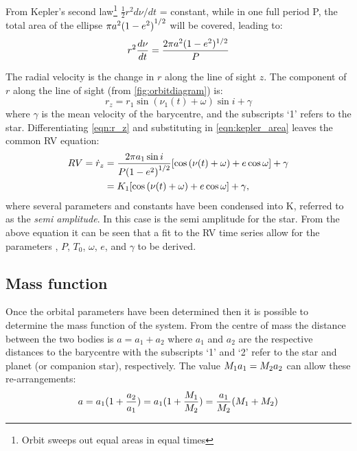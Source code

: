From Kepler's second law\footnote{Orbit sweeps out equal areas in equal times} \(\frac{1}{2} r^{2} d\nu/dt\) = constant, while in one full period P, the total area of the ellipse \(\pi a^{2}{(1 - {e}^{2})}^{1/2} \) will be covered, leading to:
\begin{equation}
    r^{2} \frac{d\nu}{dt} = \frac{2\pi a^{2}(1 - {e}^{2})^{1/2}}{P} \label{eqn:kepler_area}
\end{equation}

The radial velocity is the change in \(r\) along the line of sight \(z\).
The component of \(r\) along the line of sight (from \cref{fig:orbitdiagram}) is:
\begin{equation}
    r_z =  r_1 \sin{(\nu_1(t) + \omega)}\sin{i} + \gamma \label{eqn:r_z}
\end{equation}
where \(\gamma\) is the mean velocity of the barycentre, and the subscripts `1' refers to the star.
Differentiating \cref{eqn:r_z} and substituting in \cref{eqn:kepler_area} leaves the common {RV} equation:
\begin{align}
    {RV} = \dot{r}_z &= \frac{2 \pi a_1 \sin{i}}{P{(1 - {e}^{2})}^{1/2}} [\cos{(\nu(t) + \omega)} + e\cos{\omega}] + \gamma  \label{eqn:rv_equation} \\
     &= {K}_{1} [\cos{(\nu(t) + \omega)} + e\cos{\omega}] + \gamma,
\end{align}
where several parameters and constants have been condensed into $\textrm{K}$, referred to as the \emph{semi amplitude}.
In this case \Kone{} is the semi amplitude for the star.
From the above equation it can be seen that a fit to the {RV} time series allow for the parameters \Kone{}, \(P\), \(T_0\), \(\omega\), \(e\), and \(\gamma\) to be derived.

\subsection{Mass function}
Once the orbital parameters have been determined then it is possible to determine the mass function of the system.
From the centre of mass the distance between the two bodies is \(a = a_1 + a_2\) where $a_1$ and $a_2$ are the respective distances to the barycentre with the subscripts `1' and `2' refer to the star and planet (or companion star), respectively.
The value \({M}_{1} a_1 = {M}_{2} a_2\) can allow these re-arrangements:
\begin{equation}
    a = a_{1} (1 + \frac{a_{2}}{a_{1}}) = a_{1}(1 + \frac{{M}_{1}}{{M}_{2}}) = \frac{a_{1}}{{M}_{2}} ({M}_{1} + {M}_{2})
\end{equation}

